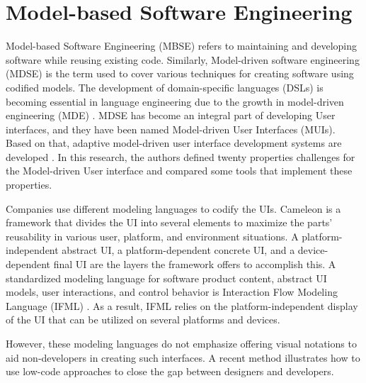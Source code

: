 \section{Model-based Software Engineering}
\label{background:section:mbse}
Model-based Software Engineering (MBSE) refers to maintaining and developing software while reusing existing code.
Similarly, Model-driven software engineering (MDSE) is the term used to cover various techniques for creating software using codified models.
The development of domain-specific languages (DSLs) is becoming essential in language engineering due to the growth in model-driven engineering (MDE) \cite{article:mbse:cuadrado}.
MDSE has become an integral part of developing User interfaces, and they have been named Model-driven User Interfaces (MUIs).
Based on that, adaptive model-driven user interface development systems are developed \cite{article:mbse:akiki}.
In this research, the authors defined twenty properties challenges for the Model-driven User interface and compared some tools that implement these properties.

Companies use different modeling languages to codify the UIs.
Cameleon \cite{article:cameleon:balme} is a framework that divides the UI into several elements to maximize the parts' reusability in various user, platform, and environment situations.
A platform-independent abstract UI, a platform-dependent concrete UI, and a device-dependent final UI are the layers the framework offers to accomplish this.
A standardized modeling language for software product content, abstract UI models, user interactions, and control behavior is Interaction Flow Modeling Language (IFML) \cite{article:ifml:piero}.
As a result, IFML relies on the platform-independent display of the UI that can be utilized on several platforms and devices.

However, these modeling languages do not emphasize offering visual notations to aid non-developers in creating such interfaces. 
A recent method \cite{article:mbse:bexiga} illustrates how to use low-code approaches to close the gap between designers and developers.

